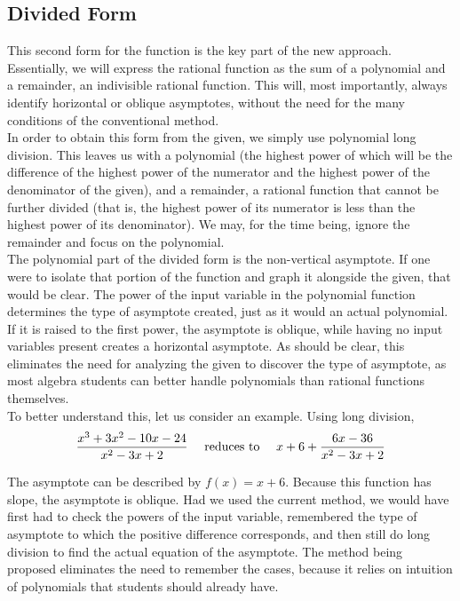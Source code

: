 \documentclass[12pt]{article}
\begin{document}
\subsection{Divided Form}

This second form for the function is the key part of the new 
approach. Essentially, we will  express the rational function
as the sum of a polynomial and a remainder, an 
indivisible rational function. This will, most importantly, always 
identify horizontal or oblique asymptotes, without the need for
the many conditions of the conventional method.\\

In order to obtain this form from the given, we simply use 		%
polynomial long division. This leaves us with a polynomial
(the highest power of which will be the difference of the 
highest power of the numerator and the highest power of
the denominator of the given), and a remainder, a rational 
function that cannot be further divided (that is, the highest
power of its numerator is less than the highest power of 
its denominator). We may, for the time being, ignore the 
remainder and focus on the polynomial.\\

The polynomial part of the divided form is the non-vertical
asymptote. If one were to isolate that portion of the function		%
and graph it alongside the given, that would be clear. The power
of the input variable in the polynomial function determines the 
type of asymptote created, just as it would an actual polynomial. 
If it is raised to the first power, the
asymptote is oblique, while having no input variables present
creates a horizontal asymptote. As should be clear, this eliminates
the need for analyzing the given to discover the type of asymptote,
as most algebra students can better handle polynomials than 
rational functions themselves. \\

To better understand this, let us consider an example. Using		%
long division,
\begin{equation} 
	\frac{x^{3}+3x^{2}-10x-24}{x^{2}-3x+2}\ \ \ \ 
	\textnormal{reduces to}\ \ \ \ 
	 x+6 + \frac{6x-36}{x^{2}-3x+2}
\end{equation}

The asymptote can be described by $f(x) = x+6$. Because this	%
function has slope, the asymptote is oblique. Had we used the 
current method, we would have first had to check the powers
of the input variable, remembered the type of asymptote to 
which the positive difference corresponds, and then still do
long division to find the actual equation of the asymptote. The
method being proposed eliminates the need to remember the 
cases, because it relies on intuition of polynomials that students 
should already have.\\
\end{document}
